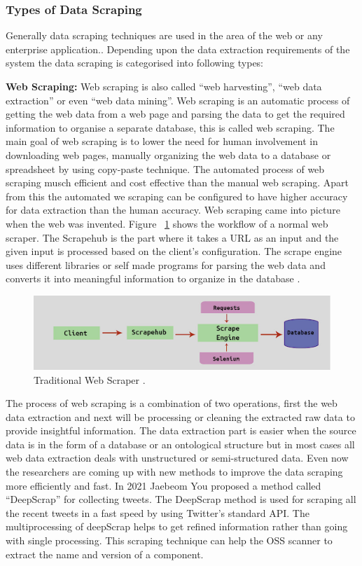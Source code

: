 \subsubsection{Types of Data Scraping}
Generally data scraping techniques are used in the area of the web or any enterprise application.. Depending upon the data extraction requirements of the system the data scraping is categorised into following types: 

{\bf Web Scraping:} Web scraping is also called “web harvesting”, “web data extraction” or even “web data mining”. Web scraping is an automatic process of getting the web data from a web page and parsing the data  to get the required information to organise a separate database, this is called web scraping. The main goal of web scraping is to lower the need for human involvement in downloading web pages, manually organizing the web data to a database or spreadsheet by using copy-paste technique. The automated process of web scraping musch efficient and cost effective than the manual web scraping. Apart from this the automated we scraping can be configured to have higher accuracy for data extraction than the human accuracy. Web scraping came into picture when the web was invented. Figure  ~\ref{fig:webscraping} shows the workflow of a normal web scraper. The Scrapehub is the part where it takes a URL as an input and the given input is processed based on the client’s configuration. The scrape engine uses different libraries or self made programs for parsing the web data and converts it into meaningful information to organize in the database \cite{SaBa2016}.

\begin{figure}[H]
	\includegraphics[width=15cm]{includes/webscraping.png}
	\centering
	\caption{ Traditional Web Scraper \cite{SaBa2016}.}
	\label{fig:webscraping}
\end{figure}
The process of web scraping is a combination of two operations, first the web data extraction and next will be processing or cleaning the extracted raw data to provide insightful information. The data extraction part is easier when the source data is in the form of a database or an ontological structure but in most cases all web data extraction deals with unstructured or semi-structured data. Even now the researchers are coming up with new methods to improve the data scraping more efficiently and fast. In 2021 Jaebeom You \cite{YoLeKw2021} proposed a method called “DeepScrap” for collecting tweets. The DeepScrap method is used for scraping all the recent tweets in a fast speed by using Twitter’s standard API. The multiprocessing of deepScrap helps to get refined information rather than going with single processing. This scraping technique can help the OSS scanner to extract the name and version of a component.

